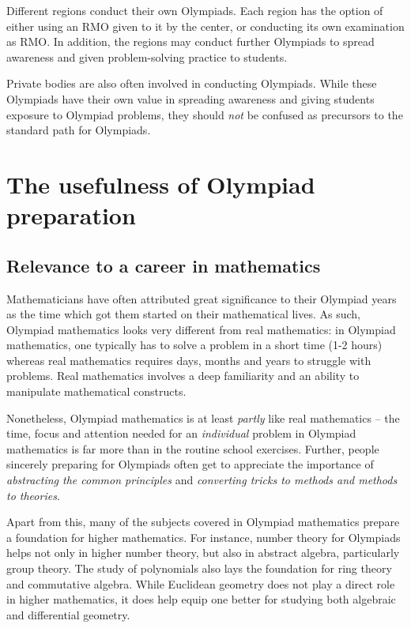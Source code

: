 \documentclass[a4paper]{amsart}
\begin{document}
Different regions conduct their own Olympiads. Each region has the
option of either using an RMO given to it by the center, or conducting
its own examination as RMO. In addition, the regions may conduct
further Olympiads to spread awareness and given problem-solving
practice to students.

Private bodies are also often involved in conducting Olympiads. While
these Olympiads have their own value in spreading awareness and giving
students exposure to Olympiad problems, they should {\em not} be confused
as precursors to the standard path for Olympiads.

\section{The usefulness of Olympiad preparation}

\subsection{Relevance to a career in mathematics}

Mathematicians have often attributed great significance to their
Olympiad years as the time which got them started on their
mathematical lives. As such, Olympiad mathematics looks very different
from real mathematics: in Olympiad mathematics, one typically has to
solve a problem in a short time (1-2 hours) whereas real mathematics
requires days, months and years to struggle with problems. Real mathematics
involves a deep familiarity and an ability to manipulate mathematical
constructs.

Nonetheless, Olympiad mathematics is at least {\em partly} like real
mathematics -- the time, focus and attention needed for an {\em
  individual} problem in Olympiad mathematics is far more than in the
routine school exercises. Further, people sincerely preparing for
Olympiads often get to appreciate the importance of {\em abstracting
  the common principles} and {\em converting tricks to methods and
  methods to theories}.

Apart from this, many of the subjects covered in Olympiad mathematics
prepare a foundation for higher mathematics. For instance, number
theory for Olympiads helps not only in higher number theory, but also
in abstract algebra, particularly group theory. The study of
polynomials also lays the foundation for ring theory and commutative
algebra.  While Euclidean geometry does not play a direct role in
higher mathematics, it does help equip one better for studying both
algebraic and differential geometry.
\end{document}
